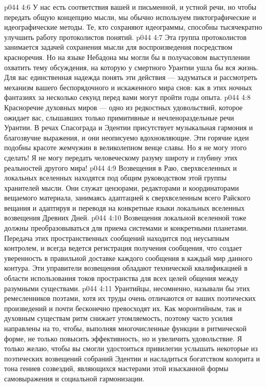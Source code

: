 \vs p044 4:6 \bibnobreakspace {} У нас есть соответствия вашей и письменной, и устной речи, но чтобы передать общую концепцию мысли, мы обычно используем пиктографические и идеографические методы. Те, кто сохраняют идеограммы, способны тысячекратно улучшить работу протоколистов понятий.
\vs p044 4:7 \bibnobreakspace {} Эта группа протоколистов занимается задачей сохранения мысли для воспроизведения посредством красноречия. Но на языке Небадона мы могли бы в получасовом выступлении охватить тему обсуждения, на которую у смертного Урантии ушла бы вся жизнь. Для вас единственная надежда понять эти действия --- задуматься и рассмотреть механизм вашего беспорядочного и искаженного мира снов: как в этих ночных фантазиях за несколько секунд перед вами могут пройти годы опыта.
\vs p044 4:8 Красноречие духовных миров --- одно из редкостных удовольствий, которое ожидает вас, слышавших только примитивные и нечленораздельные речи Урантии. В речах Спасограда и Эдентии присутствует музыкальная гармония и благозвучие выражения, и они неописуемо вдохновляющие. Эти горячие идеи подобны красоте жемчужин в великолепном венце славы. Но я не могу этого сделать! Я не могу передать человеческому разуму широту и глубину этих реальностей другого мира!
\vs p044 4:9 \bibnobreakspace {} Возвещения в Раю, сверхвселенных и локальных вселенных находятся под общим руководством этой группы хранителей мысли. Они служат цензорами, редакторами и координаторами вещаемого материала, занимаясь адаптацией к сверхвселенным всего Райского вещания и адаптируя и переводя на конкретные языки локальных вселенных возвещения Древних Дней.
\vs p044 4:10 Возвещения локальной вселенной тоже должны преобразовываться для приема системами и конкретными планетами. Передача этих пространственных сообщений находится под неусыпным контролем, и всегда ведется регистрация получения сообщения, что создает уверенность в правильной доставке каждого сообщения в каждый мир данного контура. Эти управители возвещения обладают технической квалификацией в области использования токов пространства для всех целей общения между разумными существами.
\vs p044 4:11 \bibnobreakspace {} Урантийцы, несомненно, называли бы этих ремесленников поэтами, хотя их труды очень отличаются от ваших поэтических произведений и почти бесконечно превосходят их. Как моронтийным, так и духовным существам ритм снижает утомляемость, поэтому часто усилия направлены на то, чтобы, выполняя многочисленные функции в ритмической форме, не только повысить эффективность, но и увеличить удовольствие. Я только желаю, чтобы вы смогли удостоиться привилегии услышать некоторые из поэтических возвещений собраний Эдентии и насладиться богатством колорита и тона гениев созвездий, являющихся мастерами этой изысканной формы самовыражения и социальной гармонизации.
